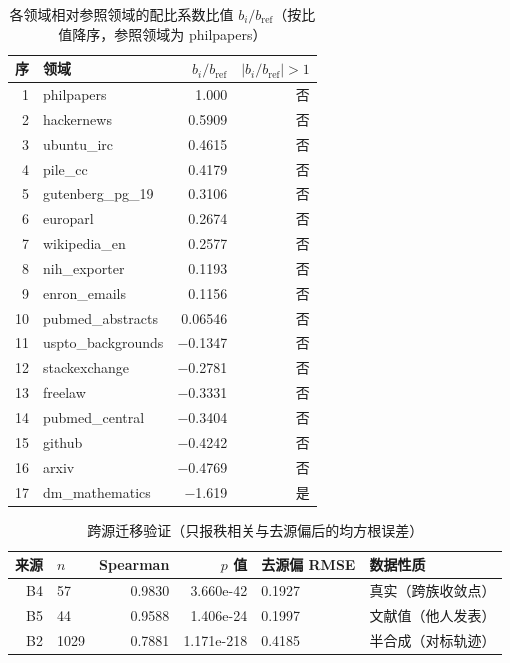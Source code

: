 \begin{table}[htbp]
  \centering
  \caption{各领域相对参照领域的配比系数比值 $b_i/b_{\text{ref}}$（按比值降序，参照领域为 philpapers）}
  \label{tab:app-q2-ratio}
  \small
  \begin{tabular}{@{}rlrr@{}}
    \toprule
    序 & 领域 & $b_i/b_{\text{ref}}$ & $|b_i/b_{\text{ref}}|>1$ \\
    \midrule
    1 & philpapers & 1.000 & 否 \\
    2 & hackernews & 0.5909 & 否 \\
    3 & ubuntu\_irc & 0.4615 & 否 \\
    4 & pile\_cc & 0.4179 & 否 \\
    5 & gutenberg\_pg\_19 & 0.3106 & 否 \\
    6 & europarl & 0.2674 & 否 \\
    7 & wikipedia\_en & 0.2577 & 否 \\
    8 & nih\_exporter & 0.1193 & 否 \\
    9 & enron\_emails & 0.1156 & 否 \\
    10 & pubmed\_abstracts & 0.06546 & 否 \\
    11 & uspto\_backgrounds & $-$0.1347 & 否 \\
    12 & stackexchange & $-$0.2781 & 否 \\
    13 & freelaw & $-$0.3331 & 否 \\
    14 & pubmed\_central & $-$0.3404 & 否 \\
    15 & github & $-$0.4242 & 否 \\
    16 & arxiv & $-$0.4769 & 否 \\
    17 & dm\_mathematics & $-$1.619 & 是 \\
    \bottomrule
  \end{tabular}
\end{table}

\begin{table}[htbp]
  \centering
  \caption{跨源迁移验证（只报秩相关与去源偏后的均方根误差）}
  \label{tab:app-q2-validation}
  \small
  \begin{tabular}{@{}rlrrll@{}}
    \toprule
    来源 & $n$ & Spearman & $p$ 值 & 去源偏 RMSE & 数据性质 \\
    \midrule
    B4 & 57 & 0.9830 & 3.660e-42 & 0.1927 & 真实（跨族收敛点） \\
    B5 & 44 & 0.9588 & 1.406e-24 & 0.1997 & 文献值（他人发表） \\
    B2 & 1029 & 0.7881 & 1.171e-218 & 0.4185 & 半合成（对标轨迹） \\
    \bottomrule
  \end{tabular}
\end{table}

